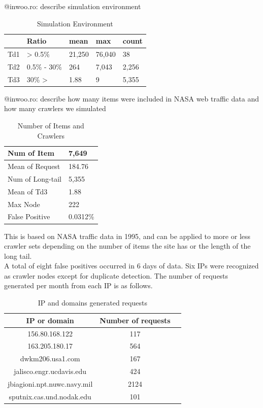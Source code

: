 \documentclass[sigconf,anonymous=false]{acmart}
\begin{document}
\begin{enumerate}
@inwoo.ro: describe simulation environment

\begin{table}[H]
  \caption{Simulation Environment}
    \begin{tabular}{| l | l | l | l | l | }
    \hline
    & Ratio & mean & max & count \\ \hline
    Td1 &  > 0.5\% & 21,250 & 76,040 & 38 \\ 
    Td2 & 0.5\% - 30\% & 264 & 7,043 & 2,256 \\
    Td3 & 30\% > & 1.88 & 9 & 5,355 \\ \hline
    \end{tabular}
\end{table}

@inwoo.ro: describe how many items were included in NASA web traffic data and how many crawlers we simulated

\begin{table}[H]
  \caption{Number of Items and Crawlers}
  \label{tab:freq}
    \begin{tabular}{| p{3.1cm} | p{2cm} |}
    \hline
    Num of Item & 7,649 \\ \hline
    Mean of Request & 184.76 \\ \hline
    Num of Long-tail & 5,355 \\ \hline
    Mean of Td3 & 1.88 \\ \hline
    Max Node & 222 \\ \hline
    False Positive & 0.0312\%  \\ \hline
    \end{tabular}
\end{table}

This is based on NASA traffic data in 1995, and can be applied to more or less crawler sets depending on the number of items the site has or the length of the long tail. \\
A total of eight false positives occurred in 6 days of data. Six IPs were recognized as crawler nodes except for duplicate detection. The number of requests generated per month from each IP is as follows.


\begin{table}[H]
  \caption{IP and domains generated requests}
  \label{tab:freq}
  \begin{tabular}{ccl}
    \toprule
    IP or domain&Number of requests\\
    \midrule
    156.80.168.122 & 117\\
    163.205.180.17 & 564\\
    dwkm206.usa1.com & 167\\
    jalisco.engr.ucdavis.edu & 424\\
    jbiagioni.npt.nuwc.navy.mil & 2124\\
    sputnix.cas.und.nodak.edu & 101\\
  \bottomrule
\end{tabular}
\end{table}



\end{enumerate}
\end{document}
